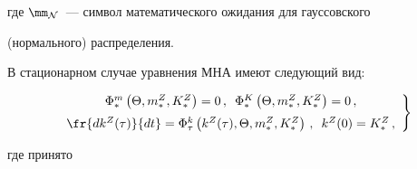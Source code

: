     где $\mm_{\cal N}$~--- символ математического ожидания для гауссовского 

(нормального) распределения.



В стационарном случае уравнения МНА имеют следующий вид:

\begin{equation}

\left.

\begin{array}{c}

\Phi_*^m \left(\Theta, m_*^Z, K_*^Z\right)=0\,,\enskip \Phi_*^K 

    \left(\Theta, m_*^Z, K_*^Z\right) =0\,,

    \\[6pt]

    \fr{dk^Z(\tau)}{dt} = \Phi_\tau^k \left(k^Z(\tau),\Theta, m_*^Z, K_*^Z\right)\,, 

    \enskip k^Z (0) = K_*^Z\,,

    \end{array}

    \right\}

    \label{e3.3-s2}

    \end{equation}

где принято



\noindent

